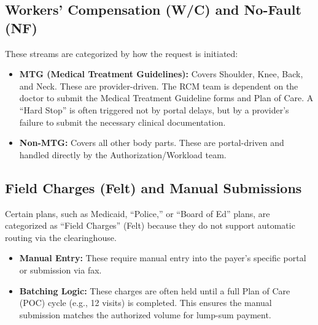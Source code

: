 \documentclass[11pt,a4paper]{article}
\begin{document}
\subsection{Workers' Compensation (W/C) and No-Fault (NF)}

These streams are categorized by how the request is initiated:

\begin{itemize}
  \item \textbf{MTG (Medical Treatment Guidelines):} Covers Shoulder, Knee, Back, and Neck. These are provider-driven. The RCM team is dependent on the doctor to submit the Medical Treatment Guideline forms and Plan of Care. A ``Hard Stop'' is often triggered not by portal delays, but by a provider's failure to submit the necessary clinical documentation.
  \item \textbf{Non-MTG:} Covers all other body parts. These are portal-driven and handled directly by the Authorization/Workload team.
\end{itemize}

\subsection{Field Charges (Felt) and Manual Submissions}

Certain plans, such as Medicaid, ``Police,'' or ``Board of Ed'' plans, are categorized as ``Field Charges'' (Felt) because they do not support automatic routing via the clearinghouse.

\begin{itemize}
  \item \textbf{Manual Entry:} These require manual entry into the payer's specific portal or submission via fax.
  \item \textbf{Batching Logic:} These charges are often held until a full Plan of Care (POC) cycle (e.g., 12 visits) is completed. This ensures the manual submission matches the authorized volume for lump-sum payment.
\end{itemize}
\end{document}
